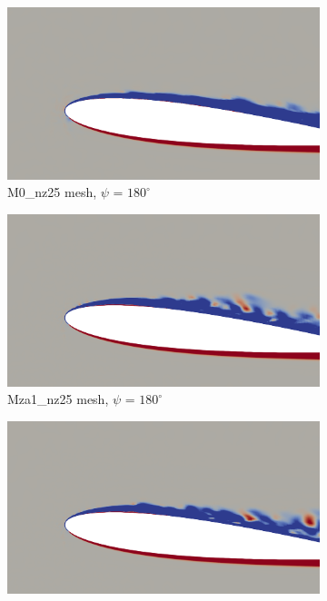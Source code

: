 \begin{figure}[H]
	\centering
	\begin{center}
	\begin{subfigure}[b]{0.475\textwidth}
		\centering
		\includegraphics[width=1\textwidth]{figures/zonal_adapt_results/vorticity_plots/v2/M0/spavg/phase_180.png}
		\caption{M0\_nz25 mesh, $\psi$ = $180^\circ$}
		\label{fig:M0_sp_psi180}
	\end{subfigure}
	\end{center}
	\begin{subfigure}[b]{0.475\textwidth}
	\centering
	\includegraphics[width=1\textwidth]{figures/zonal_adapt_results/vorticity_plots/v2/Mza1_25/spavg/phase_180.png}
	\caption{Mza1\_nz25 mesh, $\psi$ = $180^\circ$}
	\label{fig:Mza1_25_sp_psi180}
\end{subfigure}
	\begin{subfigure}[b]{0.475\textwidth}
		\centering
		\includegraphics[width=1\textwidth]{figures/zonal_adapt_results/vorticity_plots/v2/Mza1_50/spavg/phase_180.png}

\end{subfigure}
\end{figure}
